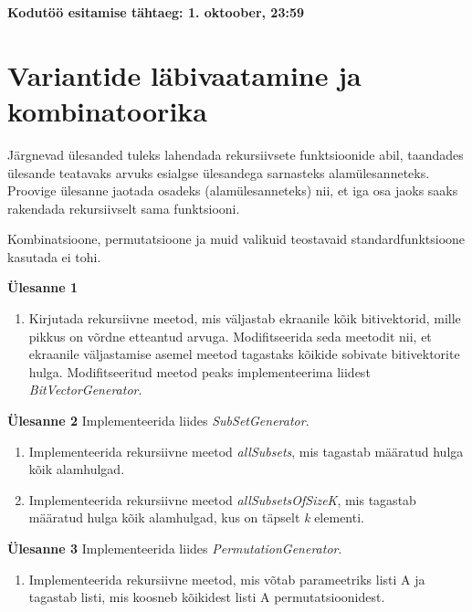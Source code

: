 \documentclass[a4paper]{article}
\begin{document}
\textbf{Kodutöö esitamise tähtaeg: 1. oktoober, 23:59}

\section*{Variantide läbivaatamine ja kombinatoorika}

Järgnevad ülesanded tuleks lahendada rekursiivsete funktsioonide abil,
taandades ülesande teatavaks arvuks esialgse ülesandega sarnasteks
alamülesanneteks. Proovige ülesanne jaotada osadeks (alamülesanneteks)
nii, et iga osa jaoks saaks rakendada rekursiivselt sama funktsiooni.

Kombinatsioone, permutatsioone ja muid valikuid teostavaid standardfunktsioone kasutada ei tohi.

\begin{problem}
\textbf{Ülesanne 1}
\begin{enumerate}
\item 
Kirjutada rekursiivne meetod, mis väljastab ekraanile kõik
bitivektorid, mille pikkus on võrdne etteantud arvuga. Modifitseerida seda meetodit nii, et ekraanile väljastamise asemel meetod tagastaks kõikide sobivate bitivektorite hulga. Modifitseeritud meetod peaks implementeerima liidest \textit{BitVectorGenerator}.
\end{enumerate}
\end{problem}

\begin{problem}
\textbf{Ülesanne 2}
\newline
Implementeerida liides \textit{SubSetGenerator}.
\begin{enumerate}
\item
Implementeerida rekursiivne meetod \textit{allSubsets}, mis tagastab määratud hulga kõik alamhulgad.
\item
Implementeerida rekursiivne meetod \textit{allSubsetsOfSizeK}, mis tagastab määratud hulga kõik alamhulgad, kus on täpselt \textit{k} elementi.
\end{enumerate}
\end{problem}

\begin{problem}
\textbf{Ülesanne 3}
\newline
Implementeerida liides \textit{PermutationGenerator}.
\begin{enumerate}
\item
Implementeerida rekursiivne meetod, mis võtab parameetriks listi A ja tagastab listi, mis koosneb kõikidest listi A permutatsioonidest.
\end{enumerate}
\end{problem}
\end{document}
